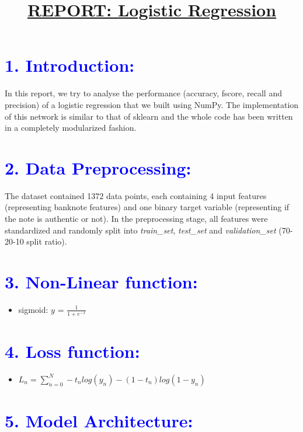 \documentclass[a4paper,10pt,twocolumn]{article}
\title{\textbf{\underline{REPORT: Logistic Regression}}}
\date{}
\author{}
\begin{document}
\maketitle
\section*{\textcolor{blue}{1. Introduction:}}
In this report, we try to analyse the performance (accuracy, fscore, recall and precision) of a logistic regression that we built using NumPy. The implementation of this network is similar to that of sklearn and the whole code has been written in a completely modularized fashion.

\section*{\textcolor{blue}{2. Data Preprocessing:}}
The dataset contained 1372 data points, each containing 4 input features (representing banknote features) and one binary target variable (representing if the note is authentic or not). In the preprocessing stage, all features were standardized and randomly split into \textit{train\_set}, \textit{test\_set} and \textit{validation\_set}  (70-20-10 split ratio).

\section*{\textcolor{blue}{3. Non-Linear function:}}
\begin{itemize}
\item{sigmoid: $y$ = $\frac{1}{1 + e^{-x}}$}
\end{itemize}

\section*{\textcolor{blue}{4. Loss function:}}
\begin{itemize}
\item{$L_n = \sum_{n=0}^{N} -t_nlog(y_n)-(1-t_n)log(1-y_n)$} 
\end{itemize}

\section*{\textcolor{blue}{5. Model Architecture:}}
\end{document}
